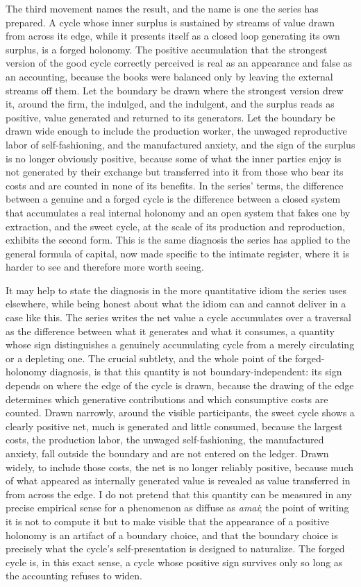 The third movement names the result, and the name is one the series has prepared. A cycle whose inner surplus is sustained by streams of value drawn from across its edge, while it presents itself as a closed loop generating its own surplus, is a forged holonomy. The positive accumulation that the strongest version of the good cycle correctly perceived is real as an appearance and false as an accounting, because the books were balanced only by leaving the external streams off them. Let the boundary be drawn where the strongest version drew it, around the firm, the indulged, and the indulgent, and the surplus reads as positive, value generated and returned to its generators. Let the boundary be drawn wide enough to include the production worker, the unwaged reproductive labor of self-fashioning, and the manufactured anxiety, and the sign of the surplus is no longer obviously positive, because some of what the inner parties enjoy is not generated by their exchange but transferred into it from those who bear its costs and are counted in none of its benefits. In the series' terms, the difference between a genuine and a forged cycle is the difference between a closed system that accumulates a real internal holonomy and an open system that fakes one by extraction, and the sweet cycle, at the scale of its production and reproduction, exhibits the second form. This is the same diagnosis the series has applied to the general formula of capital, now made specific to the intimate register, where it is harder to see and therefore more worth seeing.

It may help to state the diagnosis in the more quantitative idiom the series uses elsewhere, while being honest about what the idiom can and cannot deliver in a case like this. The series writes the net value a cycle accumulates over a traversal as the difference between what it generates and what it consumes, a quantity whose sign distinguishes a genuinely accumulating cycle from a merely circulating or a depleting one. The crucial subtlety, and the whole point of the forged-holonomy diagnosis, is that this quantity is not boundary-independent: its sign depends on where the edge of the cycle is drawn, because the drawing of the edge determines which generative contributions and which consumptive costs are counted. Drawn narrowly, around the visible participants, the sweet cycle shows a clearly positive net, much is generated and little consumed, because the largest costs, the production labor, the unwaged self-fashioning, the manufactured anxiety, fall outside the boundary and are not entered on the ledger. Drawn widely, to include those costs, the net is no longer reliably positive, because much of what appeared as internally generated value is revealed as value transferred in from across the edge. I do not pretend that this quantity can be measured in any precise empirical sense for a phenomenon as diffuse as \textit{amai}; the point of writing it is not to compute it but to make visible that the appearance of a positive holonomy is an artifact of a boundary choice, and that the boundary choice is precisely what the cycle's self-presentation is designed to naturalize. The forged cycle is, in this exact sense, a cycle whose positive sign survives only so long as the accounting refuses to widen.

